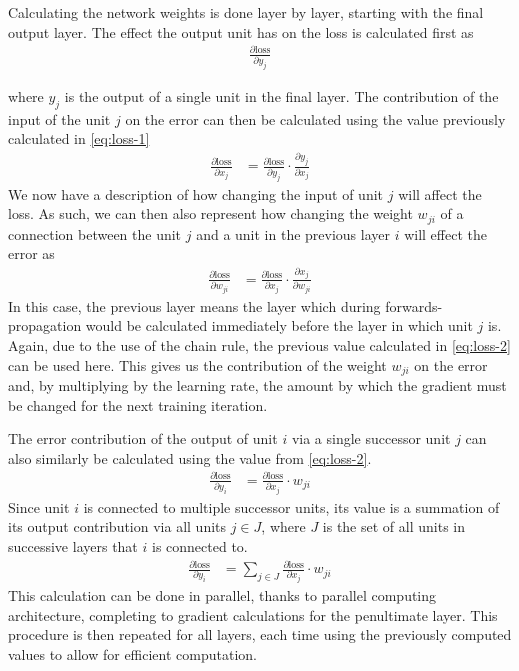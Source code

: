 Calculating the network weights is done layer by layer, starting with the final output layer.
The effect the output unit has on the loss is calculated first as
\begin{align}\label{eq:loss-1}
	\frac{\partial \text{loss}}{\partial y_j}
\end{align}

where $y_j$ is the output of a single unit in the final layer.
The contribution of the input of the unit $j$ on the error can then be calculated using the value previously calculated in \eqref{eq:loss-1}
\begin{align}\label{eq:loss-2}
	\frac{\partial \text{loss}}{\partial x_j} &= \frac{\partial \text{loss}}{\partial y_j} \cdot \frac{\partial y_j}{\partial x_j}
\end{align}
We now have a description of how changing the input of unit $j$ will affect the loss.
As such, we can then also represent how changing the weight $w_{ji}$ of a connection between the unit $j$ and a unit in the previous layer $i$ will effect the error as
\begin{align}\label{eq:loss-3}
	\frac{\partial \text{loss}}{\partial w_{ji}} &= \frac{\partial \text{loss}}{\partial x_j} \cdot \frac{\partial x_j}{\partial w_{ji}}
\end{align}
In this case, the previous layer means the layer which during forwards-propagation would be calculated immediately before the layer in which unit $j$ is.
Again, due to the use of the chain rule, the previous value calculated in \eqref{eq:loss-2} can be used here.
This gives us the contribution of the weight $w_{ji}$ on the error and, by multiplying by the learning rate, the amount by which the gradient must be changed for the next training iteration.

The error contribution of the output of unit $i$ via a single successor unit $j$ can also similarly be calculated using the value from \eqref{eq:loss-2}.
\begin{align}\label{eq:loss-4}
	\frac{\partial \text{loss}}{\partial y_i} &= \frac{\partial \text{loss}}{\partial x_j} \cdot w_{ji}
\end{align}
Since unit $i$ is connected to multiple successor units, its value is a summation of its output contribution via all units $j \in J$, where $J$ is the set of all units in successive layers that $i$ is connected to.
\begin{align}
	\frac{\partial \text{loss}}{\partial y_i} &= \sum_{j \in J} \frac{\partial \text{loss}}{\partial x_j} \cdot w_{ji}
\end{align}
This calculation can be done in parallel, thanks to parallel computing architecture, completing to gradient calculations for the penultimate layer.
This procedure is then repeated for all layers, each time using the previously computed values to allow for efficient computation.

